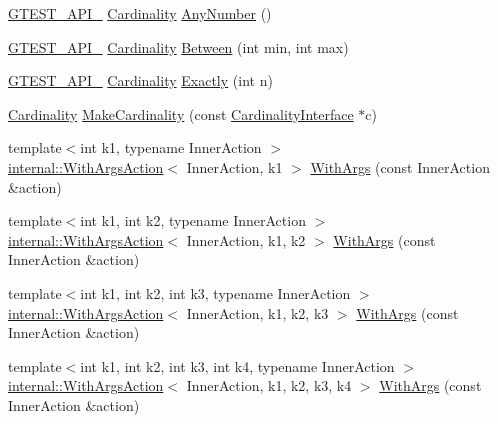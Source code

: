 \begin{DoxyCompactItemize}
\item 
\hyperlink{gtest-port_8h_aa73be6f0ba4a7456180a94904ce17790}{G\+T\+E\+S\+T\+\_\+\+A\+P\+I\+\_\+} \hyperlink{classtesting_1_1Cardinality}{Cardinality} \hyperlink{namespacetesting_aa1f8a6371097e1e9b8d6866020f35252}{Any\+Number} ()
\item 
\hyperlink{gtest-port_8h_aa73be6f0ba4a7456180a94904ce17790}{G\+T\+E\+S\+T\+\_\+\+A\+P\+I\+\_\+} \hyperlink{classtesting_1_1Cardinality}{Cardinality} \hyperlink{namespacetesting_a3bb2d3cdd3fdf5b4be1480fce549918e}{Between} (int min, int max)
\item 
\hyperlink{gtest-port_8h_aa73be6f0ba4a7456180a94904ce17790}{G\+T\+E\+S\+T\+\_\+\+A\+P\+I\+\_\+} \hyperlink{classtesting_1_1Cardinality}{Cardinality} \hyperlink{namespacetesting_aa9b1b32ba9e8d3db8ac0af0fc8785c8d}{Exactly} (int n)
\item 
\hyperlink{classtesting_1_1Cardinality}{Cardinality} \hyperlink{namespacetesting_af567006969875ab70fc6aa3029576774}{Make\+Cardinality} (const \hyperlink{classtesting_1_1CardinalityInterface}{Cardinality\+Interface} $\ast$c)
\item 
{\footnotesize template$<$int k1, typename Inner\+Action $>$ }\\\hyperlink{classtesting_1_1internal_1_1WithArgsAction}{internal\+::\+With\+Args\+Action}$<$ Inner\+Action, k1 $>$ \hyperlink{namespacetesting_a3bd9eef13bee9065b19d3cd571829c7c}{With\+Args} (const Inner\+Action \&action)
\item 
{\footnotesize template$<$int k1, int k2, typename Inner\+Action $>$ }\\\hyperlink{classtesting_1_1internal_1_1WithArgsAction}{internal\+::\+With\+Args\+Action}$<$ Inner\+Action, k1, k2 $>$ \hyperlink{namespacetesting_aa82fc09250ba172220e6fb7e77249e74}{With\+Args} (const Inner\+Action \&action)
\item 
{\footnotesize template$<$int k1, int k2, int k3, typename Inner\+Action $>$ }\\\hyperlink{classtesting_1_1internal_1_1WithArgsAction}{internal\+::\+With\+Args\+Action}$<$ Inner\+Action, k1, k2, k3 $>$ \hyperlink{namespacetesting_a999614cb785165b9a44a9a95a3753407}{With\+Args} (const Inner\+Action \&action)
\item 
{\footnotesize template$<$int k1, int k2, int k3, int k4, typename Inner\+Action $>$ }\\\hyperlink{classtesting_1_1internal_1_1WithArgsAction}{internal\+::\+With\+Args\+Action}$<$ Inner\+Action, k1, k2, k3, k4 $>$ \hyperlink{namespacetesting_a646a2e4ac7866ee8c486cb167ba9b45e}{With\+Args} (const Inner\+Action \&action)

\end{DoxyCompactItemize}
